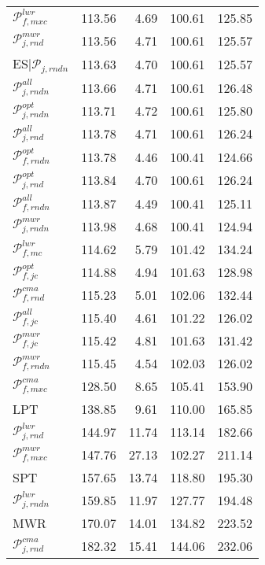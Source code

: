 \begin{tabular}{|@{}l@{}|@{}r@{}|@{}r@{}|@{}r@{}|@{}r@{}|}
${\mathcal{P}_{f,mxc}^{lwr}}$ &  113.56 &  4.69 &  100.61 &  125.85  \\ 
${\mathcal{P}_{j,rnd}^{mwr}}$ &  113.56 &  4.71 &  100.61 &  125.57  \\ 
ES$|{\mathcal{P}_{j,rndn}}$ &  113.63 &  4.70 &  100.61 &  125.57  \\ 
${\mathcal{P}_{j,rndn}^{all}}$ &  113.66 &  4.71 &  100.61 &  126.48  \\ 
${\mathcal{P}_{j,rndn}^{opt}}$ &  113.71 &  4.72 &  100.61 &  125.80  \\ 
${\mathcal{P}_{j,rnd}^{all}}$ &  113.78 &  4.71 &  100.61 &  126.24  \\ 
\boldmath${\mathcal{P}_{f,rndn}^{opt}}$ &  113.78 &  4.46 &  100.41 &  124.66  \\ 
${\mathcal{P}_{j,rnd}^{opt}}$ &  113.84 &  4.70 &  100.61 &  126.24  \\ 
\boldmath${\mathcal{P}_{f,rndn}^{all}}$ &  113.87 &  4.49 &  100.41 &  125.11  \\ 
${\mathcal{P}_{j,rndn}^{mwr}}$ &  113.98 &  4.68 &  100.41 &  124.94  \\ 
${\mathcal{P}_{f,mc}^{lwr}}$ &  114.62 &  5.79 &  101.42 &  134.24  \\ 
${\mathcal{P}_{f,jc}^{opt}}$ &  114.88 &  4.94 &  101.63 &  128.98  \\ 
${\mathcal{P}_{f,rnd}^{cma}}$ &  115.23 &  5.01 &  102.06 &  132.44  \\ 
${\mathcal{P}_{f,jc}^{all}}$ &  115.40 &  4.61 &  101.22 &  126.02  \\ 
${\mathcal{P}_{f,jc}^{mwr}}$ &  115.42 &  4.81 &  101.63 &  131.42  \\ 
\boldmath${\mathcal{P}_{f,rndn}^{mwr}}$ &  115.45 &  4.54 &  102.03 &  126.02  \\ \hline\hline
${\mathcal{P}_{f,mxc}^{cma}}$ &  128.50 &  8.65 &  105.41 &  153.90  \\ \hline\hline
LPT &  138.85 &  9.61 &  110.00 &  165.85  \\ \hline\hline
${\mathcal{P}_{j,rnd}^{lwr}}$ &  144.97 &  11.74 &  113.14 &  182.66  \\ \hline\hline
${\mathcal{P}_{f,mxc}^{mwr}}$ &  147.76 &  27.13 &  102.27 &  211.14  \\ \hline\hline
SPT &  157.65 &  13.74 &  118.80 &  195.30  \\ \hline\hline
${\mathcal{P}_{j,rndn}^{lwr}}$ &  159.85 &  11.97 &  127.77 &  194.48  \\ \hline\hline
MWR &  170.07 &  14.01 &  134.82 &  223.52  \\ \hline\hline
${\mathcal{P}_{j,rnd}^{cma}}$ &  182.32 &  15.41 &  144.06 &  232.06  \\ \hline
\end{tabular}
